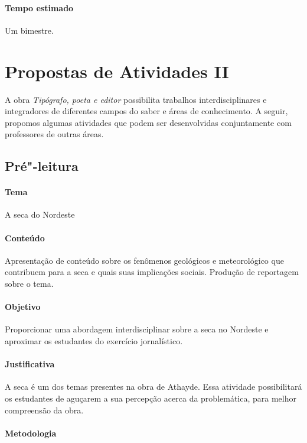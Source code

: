 \documentclass[12pt]{extarticle}
\begin{document}
\paragraph{Tempo estimado} Um bimestre.


\section{Propostas de Atividades II}

A obra \emph{Tipógrafo, poeta e editor} possibilita trabalhos
interdisciplinares e integradores de diferentes campos do saber e áreas de
conhecimento. A seguir, propomos algumas atividades que podem ser desenvolvidas
conjuntamente com professores de outras áreas.

\subsection{Pré"-leitura}

\paragraph{Tema} A seca do Nordeste

\paragraph{Conteúdo} Apresentação de conteúdo sobre os fenômenos geológicos
e meteorológico que contribuem para a seca e quais suas implicações sociais.
Produção de reportagem sobre o tema.

\paragraph{Objetivo} Proporcionar uma abordagem interdisciplinar sobre a seca
no Nordeste e aproximar os estudantes do exercício jornalístico.

\paragraph{Justificativa} A seca é um dos temas presentes na obra de Athayde.
Essa atividade possibilitará os estudantes de aguçarem a sua percepção acerca
da problemática, para melhor compreensão da obra.

\paragraph{Metodologia}
\end{document}
